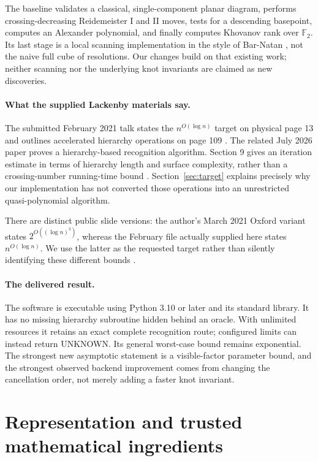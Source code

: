 \documentclass[11pt]{article}
\theoremstyle{definition}\newtheorem{definition}[theorem]{Definition}
\theoremstyle{remark}\newtheorem{remark}[theorem]{Remark}
\newcommand{\F}{\mathbb F_2}
\newcommand{\UNKNOWN}{\textsf{UNKNOWN}}
\begin{document}
The baseline validates a classical, single-component planar diagram, performs
crossing-decreasing Reidemeister I and II moves, tests for a descending
basepoint, computes an Alexander polynomial, and finally computes Khovanov
rank over $\F$. Its last stage is a local scanning implementation in the style
of Bar-Natan \cite{BN}, not the naive full cube of resolutions. Our changes
build on that existing work; neither scanning nor the underlying knot
invariants are claimed as new discoveries.

\paragraph{What the supplied Lackenby materials say.}
The submitted February 2021 talk states the $n^{O(\log n)}$ target on physical
page 13 and outlines accelerated hierarchy operations on page 109
\cite{Ltalk}. The related July 2026 paper proves a hierarchy-based recognition
algorithm. Section 9 gives an iteration estimate in terms of hierarchy length
and surface complexity, rather than a crossing-number running-time bound
\cite{L2026}. Section~\ref{sec:target} explains precisely why our implementation
has not converted those operations into an unrestricted quasi-polynomial
algorithm.

There are distinct public slide versions: the author's March 2021 Oxford
variant states $2^{O((\log n)^3)}$, whereas the February file actually supplied
here states $n^{O(\log n)}$. We use the latter as the requested target rather
than silently identifying these different bounds \cite{Ltalk,Loxford}.

\paragraph{The delivered result.}
The software is executable using Python 3.10 or later and its standard library.
It has no missing hierarchy subroutine hidden behind an oracle. With unlimited
resources it retains an exact complete recognition route; configured limits
can instead return \UNKNOWN. Its general worst-case bound remains exponential.
The strongest new asymptotic statement is a visible-factor parameter bound,
and the strongest observed backend improvement comes from changing the
cancellation order, not merely adding a faster knot invariant.

\section{Representation and trusted mathematical ingredients}
\label{sec:representation}
\end{document}
